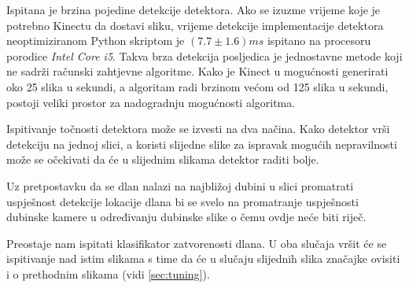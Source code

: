 \documentclass[times, utf8, diplomski, numeric]{fer}
\begin{document}
Ispitana je brzina pojedine detekcije detektora. Ako se izuzme vrijeme koje je potrebno Kinectu da dostavi sliku, vrijeme detekcije implementacije detektora neoptimiziranom Python skriptom je $(7.7 \pm 1.6) ms$ ispitano na procesoru porodice \textit{Intel Core i5}. Takva brza detekcija posljedica je jednostavne metode koji ne sadrži računski zahtjevne algoritme. Kako je Kinect u mogućnosti generirati oko 25 slika u sekundi, a algoritam radi brzinom većom od 125 slika u sekundi, postoji veliki prostor za nadogradnju mogućnosti algoritma.

Ispitivanje točnosti detektora može se izvesti na dva načina. Kako detektor vrši detekciju na jednoj slici, a koristi slijedne slike za ispravak mogućih nepravilnosti može se očekivati da će u slijednim slikama detektor raditi bolje.

Uz pretpostavku da se dlan nalazi na najbližoj dubini u slici promatrati uspješnost detekcije lokacije dlana bi se svelo na promatranje uspješnosti dubinske kamere u određivanju dubinske slike o čemu ovdje neće biti riječ.

Preostaje nam ispitati klasifikator zatvorenosti dlana. U oba slučaja vršit će se ispitivanje nad istim slikama s time da će u slučaju slijednih slika značajke ovisiti i o prethodnim slikama (vidi \ref{sec:tuning}).
\end{document}
